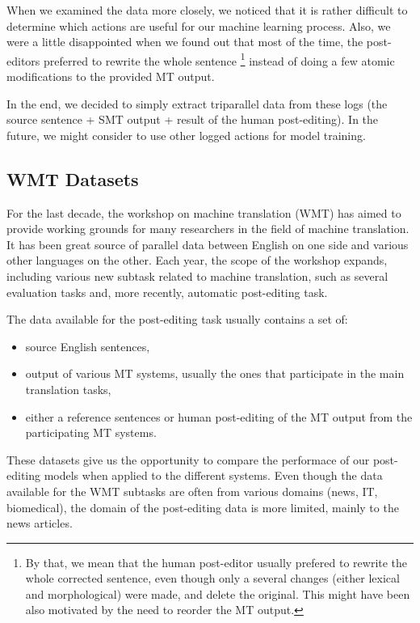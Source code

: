 When we examined the data more closely,
we noticed that it is rather difficult to determine which actions are
useful for our machine learning process. Also, we were a little disappointed
when we found out that most of the time, the post-editors preferred to
rewrite the whole sentence \footnote{By that, we mean that the
human post-editor usually prefered to rewrite the whole corrected sentence, even though
only a several changes (either lexical and morphological) were made, and delete the original.
This might have been also motivated by the need to reorder the MT output.}
instead of doing a few atomic modifications to the provided MT output.

In the end, we decided to simply extract triparallel data from these logs (the source
sentence + SMT output + result of the human post-editing). In the future,
we might consider to use other logged actions for model training.

\subsection{WMT Datasets}

For the last decade, the workshop on machine translation (WMT) has aimed
to provide working grounds for many researchers in the field of machine
translation. It has been great source of parallel data between English
on one side and various other languages on the other. Each year, the scope
of the workshop expands, including various new subtask related to machine translation,
such as several evaluation tasks and, more recently, automatic post-editing task.

The data available for the post-editing task usually contains a set of:
\begin{itemize}
    \item source English sentences,
    \item output of various MT systems, usually the ones that participate in the main
translation tasks,
    \item either a reference sentences or human post-editing of the MT output from the participating MT systems.
\end{itemize}

These datasets give us the opportunity to compare the performace of our post-editing
models when applied to the different systems. Even though the data available for the
WMT subtasks are often from various domains (news, IT, biomedical), the domain of the post-editing
data is more limited, mainly to the news articles.

